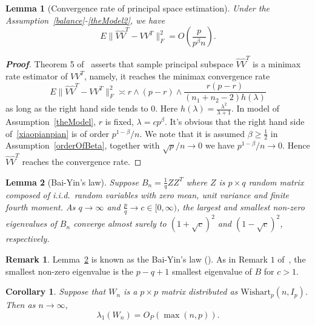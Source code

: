 \documentclass[review]{elsarticle}
\theoremstyle{plain}
\newtheorem{corollary}{\quad\quad Corollary}
\newtheorem{lemma}{\quad\quad Lemma}
\theoremstyle{definition}
\newtheorem{remark}{\quad\quad Remark}
\theoremstyle{remark}
\begin{document}
\begin{lemma}[Convergence rate of principal space estimation]\label{conRateLemma}
    Under the Assumption~\ref{balance}-\ref{theModel2}, we have
\begin{equation*}
E\|\hat{V}\hat{V}^T-VV^T\|^2_F =O(\frac{p}{p^{\beta}n}).
\end{equation*}
\end{lemma}


\begin{proof}[\textbf{Proof}]
    Theorem 5 of~\cite{Cai2012Sparse} asserts that sample principal subspace $\hat{V}\hat{V}^T$ is a minimax rate estimator of $VV^T$, namely, it reaches the minimax convergence rate
    \begin{equation}\label{xiaopianpian}
         E\|\hat{V}\hat{V}^T-VV^T\|^2_F\asymp r\wedge (p-r)\wedge \frac{r(p-r)}{(n_1+n_2-2)h(\lambda)}
    \end{equation}
    as long as the right hand side tends to $0$. Here $h(\lambda)=\frac{\lambda^2}{\lambda+1}$. In model of Assumption~\ref{theModel},  $r$ is fixed, $\lambda=cp^\beta$.
    It's obvious that the right hand side of~\eqref{xiaopianpian} is of order ${p^{1-\beta}}/{n}$.
    We note that it is assumed $\beta\geq \frac{1}{2}$ in Assumption~\ref{orderOfBeta}, together with ${\sqrt{p}}/{n}\to 0$ we have
    ${p^{1-\beta}}/{n}\to 0$. Hence
    $\hat{V}\hat{V}^T$ reaches the convergence rate.

\end{proof}
\begin{lemma}[Bai-Yin's law]\label{baiyin}
    Suppose $B_n=\frac{1}{q} Z Z^T$ where $Z$ is $p\times q$ random matrix composed of i.i.d.\ random variables with zero mean, unit variance and finite fourth moment.
    As $q\to \infty$ and $\frac{p}{q}\to c\in [0,\infty)$, the largest and smallest non-zero eigenvalues of $B_n$ converge almost surely to ${(1+\sqrt{c})}^2$ and $(1-\sqrt{c})^2$, respectively.
\end{lemma}
\begin{remark}
    Lemma~\ref{baiyin} is known as the Bai-Yin's law (\cite{bai1993limit}). As in Remark $1$ of~\cite{bai1993limit}, the smallest non-zero eigenvalue is the $p-q+1$ smallest eigenvalue of $B$ for $c>1$.
\end{remark}
\begin{corollary}\label{maxEigen}
    Suppose that $W_n$ is a $p \times p$ matrix distributed as $\mathrm{Wishart}_p(n,I_{p})$. Then as $n\to \infty$,
    $$
        \lambda_1(W_n)=O_P(\max(n,p)).
    $$
\end{corollary}
\end{document}
